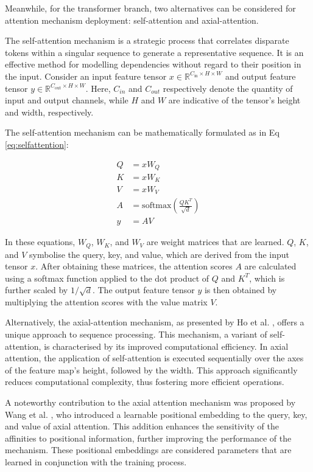Meanwhile, for the transformer branch, two alternatives can be considered for attention mechanism deployment: self-attention and axial-attention.

The self-attention mechanism is a strategic process that correlates disparate tokens within a singular sequence to generate a representative sequence. It is an effective method for modelling dependencies without regard to their position in the input. Consider an input feature tensor $x \in \mathbb{R}^{C_{\text{in}} \times H \times W}$ and output feature tensor $y \in \mathbb{R}^{C_{\text{out}} \times H \times W}$. Here, $C_{in}$ and $C_{out}$ respectively denote the quantity of input and output channels, while $H$ and $W$ are indicative of the tensor's height and width, respectively. 

The self-attention mechanism can be mathematically formulated as in Eq \ref{eq:selfattention}:

\begin{equation} \label{eq:selfattention}
\begin{split}
    Q &= xW_{Q}\\
    K &= xW_{K}\\
    V &= xW_{V}\\
    A &= \text{softmax}\left(\frac{QK^{T}}{\sqrt{d}}\right)\\
    y &= AV
\end{split}
\end{equation}

In these equations, $W_Q$, $W_K$, and $W_V$ are weight matrices that are learned. $Q$, $K$, and $V$ symbolise the query, key, and value, which are derived from the input tensor $x$. After obtaining these matrices, the attention scores $A$ are calculated using a softmax function applied to the dot product of $Q$ and $K^T$, which is further scaled by $1/\sqrt{d}$. The output feature tensor $y$ is then obtained by multiplying the attention scores with the value matrix $V$. 

Alternatively, the axial-attention mechanism, as presented by Ho et al. \cite{ho2019axial}, offers a unique approach to sequence processing. This mechanism, a variant of self-attention, is characterised by its improved computational efficiency. In axial attention, the application of self-attention is executed sequentially over the axes of the feature map's height, followed by the width. This approach significantly reduces computational complexity, thus fostering more efficient operations.

A noteworthy contribution to the axial attention mechanism was proposed by Wang et al. \cite{wang2020axial}, who introduced a learnable positional embedding to the query, key, and value of axial attention. This addition enhances the sensitivity of the affinities to positional information, further improving the performance of the mechanism. These positional embeddings are considered parameters that are learned in conjunction with the training process.

